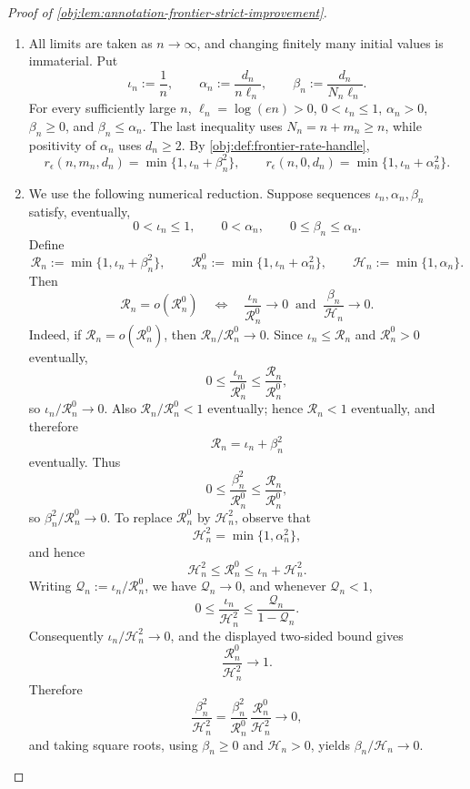 \begin{proof}[Proof of \cref{obj:lem:annotation-frontier-strict-improvement}]
\begin{enumerate}
\item
All limits are taken as \(n\to\infty\), and changing finitely many initial values is immaterial.  Put
\[
\iota_n:=\frac1n,\qquad
\alpha_n:=\frac{d_n}{n\ell_n},\qquad
\beta_n:=\frac{d_n}{N_n\ell_n}.
\]
For every sufficiently large \(n\), \(\ell_n=\log(en)>0\), \(0<\iota_n\le 1\), \(\alpha_n>0\), \(\beta_n\ge0\), and \(\beta_n\le\alpha_n\).  The last inequality uses \(N_n=n+m_n\ge n\), while positivity of \(\alpha_n\) uses \(d_n\ge2\).
By \cref{obj:def:frontier-rate-handle},
\[
r_\epsilon(n,m_n,d_n)=\min\{1,\iota_n+\beta_n^2\},
\qquad
r_\epsilon(n,0,d_n)=\min\{1,\iota_n+\alpha_n^2\}.
\]

\item
We use the following numerical reduction.  Suppose sequences
\(\iota_n,\alpha_n,\beta_n\) satisfy, eventually,
\[
0<\iota_n\le1,\qquad 0<\alpha_n,\qquad 0\le\beta_n\le\alpha_n.
\]
Define
\[
\mathcal R_n:=\min\{1,\iota_n+\beta_n^2\},\qquad
\mathcal R^0_n:=\min\{1,\iota_n+\alpha_n^2\},\qquad
\mathcal H_n:=\min\{1,\alpha_n\}.
\]
Then
\[
\mathcal R_n=o(\mathcal R^0_n)
\quad\Longleftrightarrow\quad
\frac{\iota_n}{\mathcal R^0_n}\to0
\ \text{ and }\
\frac{\beta_n}{\mathcal H_n}\to0.
\]
Indeed, if \(\mathcal R_n=o(\mathcal R^0_n)\), then
\(\mathcal R_n/\mathcal R^0_n\to0\).  Since
\(\iota_n\le\mathcal R_n\) and \(\mathcal R^0_n>0\) eventually,
\[
0\le\frac{\iota_n}{\mathcal R^0_n}
\le
\frac{\mathcal R_n}{\mathcal R^0_n},
\]
so \(\iota_n/\mathcal R^0_n\to0\).  Also
\(\mathcal R_n/\mathcal R^0_n<1\) eventually; hence \(\mathcal R_n<1\) eventually, and therefore
\[
\mathcal R_n=\iota_n+\beta_n^2
\]
eventually.  Thus
\[
0\le
\frac{\beta_n^2}{\mathcal R^0_n}
\le
\frac{\mathcal R_n}{\mathcal R^0_n},
\]
so \(\beta_n^2/\mathcal R^0_n\to0\).  To replace \(\mathcal R^0_n\) by \(\mathcal H_n^2\), observe that
\[
\mathcal H_n^2=\min\{1,\alpha_n^2\},
\]
and hence
\[
\mathcal H_n^2\le \mathcal R^0_n\le \iota_n+\mathcal H_n^2.
\]
Writing \(\mathcal Q_n:=\iota_n/\mathcal R^0_n\), we have \(\mathcal Q_n\to0\), and whenever
\(\mathcal Q_n<1\),
\[
0\le
\frac{\iota_n}{\mathcal H_n^2}
\le
\frac{\mathcal Q_n}{1-\mathcal Q_n}.
\]
Consequently \(\iota_n/\mathcal H_n^2\to0\), and the displayed two-sided bound gives
\[
\frac{\mathcal R^0_n}{\mathcal H_n^2}\to1.
\]
Therefore
\[
\frac{\beta_n^2}{\mathcal H_n^2}
=
\frac{\beta_n^2}{\mathcal R^0_n}\,
\frac{\mathcal R^0_n}{\mathcal H_n^2}
\to0,
\]
and taking square roots, using \(\beta_n\ge0\) and \(\mathcal H_n>0\), yields
\(\beta_n/\mathcal H_n\to0\).


\end{enumerate}
\end{proof}
